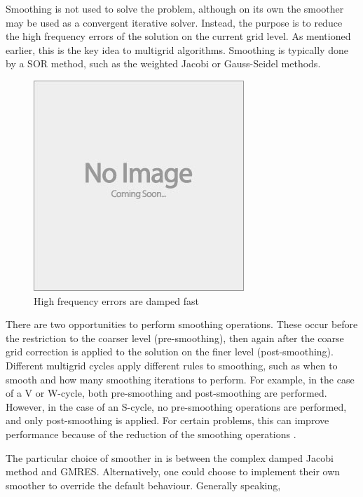 Smoothing is not used to solve the problem, although on its own the smoother may be used as a convergent iterative solver.
Instead, the purpose is to reduce the high frequency errors of the solution on the current grid level.
As mentioned earlier, this is the key idea to multigrid algorithms.
Smoothing is typically done by a SOR method, such as the weighted Jacobi or Gauss-Seidel methods.

\begin{figure}
	\includegraphics[draft]{images/placeholder}
	\caption{High frequency errors are damped fast}
\end{figure}


There are two opportunities to perform smoothing operations.
These occur before the restriction to the coarser level (pre-smoothing), then again after the coarse grid correction is applied to the solution on the finer level (post-smoothing).
Different multigrid cycles apply different rules to smoothing, such as when to smooth and how many smoothing iterations to perform.
For example, in the case of a V or W-cycle, both pre-smoothing and post-smoothing are performed.
However, in the case of an S-cycle, no pre-smoothing operations are performed, and only post-smoothing is applied.
For certain problems, this can improve performance because of the reduction of the smoothing operations \cite{iyengar}.

The particular choice of smoother in \oomph is between the complex damped Jacobi method and GMRES.
Alternatively, one could choose to implement their own smoother to override the default behaviour.
Generally speaking, 

